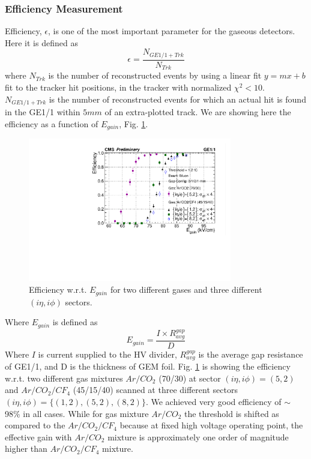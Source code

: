 \subsubsection{Efficiency Measurement}
Efficiency, $\epsilon$, is one of the most important parameter for the gaseous detectors. Here it is defined as 
\begin{equation}
\epsilon = \frac{N_{GE1/1+Trk}}{N_{Trk}}
\end{equation}
where $N_{Trk}$ is the number of reconstructed events by using a linear fit $y = mx + b$ fit to the tracker hit positions, in the tracker with normalized $\chi^2<10$.
$N_{GE1/1+Trk}$ is the number of reconstructed events for which an actual hit is found in the GE1/1 within $5mm$ of an extra-plotted track.
We are showing here the efficiency as a function of $E_{gain}$, Fig. \ref{Efficiency}. 
\begin{figure}[!htbp]
\centering
\includegraphics[width=3.5in]{figures/GEM/EfficiencyPlot_wrt_EGain_wError4times_2gas.pdf}
\caption{Efficiency w.r.t. $E_{gain}$ for two different gases and three different $(i\eta,i\phi)$ sectors.}
\label{Efficiency}
\end{figure}
Where $E_{gain}$ is defined as
\begin{equation}
E_{gain} = \frac{I\times R_{avg}^{gap}}{D}
\end{equation}
Where $I$ is current supplied to the HV divider,
      $R_{avg}^{gap}$ is the average gap resistance of GE1/1,
      and D is the thickness of GEM foil.
      Fig. \ref{Efficiency} is showing the efficiency w.r.t. two different gas mixtures $Ar/CO_2$ (70/30) at sector $(i\eta,i\phi)=(5,2)$ and $Ar/CO_2/CF_4$ (45/15/40) scanned at three different sectors $(i\eta,i\phi)=\{(1,2),(5,2),(8,2)\}$. We achieved very good efficiency of $\sim$ 98\% in all cases. While for gas mixture $Ar/CO_2$ the threshold is shifted as compared to the $Ar/CO_2/CF_4$ because at fixed high voltage operating point, the effective gain with $Ar/CO_2$  mixture is approximately one order of magnitude higher than $Ar/CO_2/CF_4$ mixture.
      

